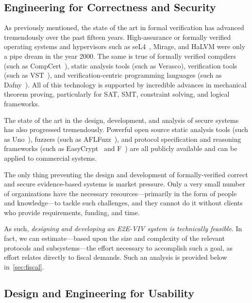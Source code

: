 \subsection{Engineering for Correctness and Security}

As previously mentioned, the state of the art in formal verification
has advanced tremendously over the past fifteen years. High-assurance
or formally verified operating systems and hypervisors such as
seL4~\cite{klein2009sel4}, Mirage, and HaLVM were only a pipe dream in the year
2000. The same is true of formally verified compilers (such as
CompCert~\cite{CompCert}), static analysis tools (such as Verasco),
verification tools (such as VST~\cite{VST}), and verification-centric
programming languages (such as Dafny~\cite{Dafny}). All of this
technology is supported by incredible advances in mechanical theorem
proving, particularly for SAT, SMT, constraint solving, and logical
frameworks.

The state of the art in the design, development, and analysis of
secure systems has also progressed tremendously. Powerful open source
static analysis tools (such as Uno~\cite{holzmann2002static}), fuzzers (such as
AFLFuzz~\cite{AFLFuzz}), and protocol specification and reasoning
frameworks (such as EasyCrypt~\cite{EasyCrypt} and F\*~\cite{Fstar})
are all publicly available and can be applied to commercial systems.

The only thing preventing the design and development of
formally-verified correct and secure evidence-based systems is market
pressure. Only a very small number of organizations have the necessary
resources---primarily in the form of people and knowledge---to tackle
such challenges, and they cannot do it without clients who provide
requirements, funding, and time.

As such, \emph{designing and developing an E2E-VIV system is
  technically feasible}.  In fact, we can estimate---based upon the
size and complexity of the relevant protocols and subsystems---the
effort necessary to accomplish such a goal, as effort relates directly
to fiscal demands. Such an analysis is provided below
in~\autoref{sec:fiscal}.

\subsection{Design and Engineering for Usability}

